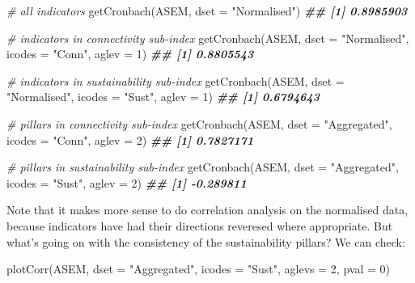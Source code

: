 \documentclass[
]{book}
\newenvironment{Shaded}{\begin{snugshade}}{\end{snugshade}}
\newcommand{\AttributeTok}[1]{\textcolor[rgb]{0.77,0.63,0.00}{#1}}
\newcommand{\CommentTok}[1]{\textcolor[rgb]{0.56,0.35,0.01}{\textit{#1}}}
\newcommand{\DecValTok}[1]{\textcolor[rgb]{0.00,0.00,0.81}{#1}}
\newcommand{\DocumentationTok}[1]{\textcolor[rgb]{0.56,0.35,0.01}{\textbf{\textit{#1}}}}
\newcommand{\FunctionTok}[1]{\textcolor[rgb]{0.00,0.00,0.00}{#1}}
\newcommand{\NormalTok}[1]{#1}
\newcommand{\StringTok}[1]{\textcolor[rgb]{0.31,0.60,0.02}{#1}}
\begin{document}
\begin{Shaded}
\begin{Highlighting}[]
\CommentTok{\# all indicators}
\FunctionTok{getCronbach}\NormalTok{(ASEM, }\AttributeTok{dset =} \StringTok{"Normalised"}\NormalTok{)}
\DocumentationTok{\#\# [1] 0.8985903}

\CommentTok{\# indicators in connectivity sub{-}index}
\FunctionTok{getCronbach}\NormalTok{(ASEM, }\AttributeTok{dset =} \StringTok{"Normalised"}\NormalTok{, }\AttributeTok{icodes =} \StringTok{"Conn"}\NormalTok{, }\AttributeTok{aglev =} \DecValTok{1}\NormalTok{)}
\DocumentationTok{\#\# [1] 0.8805543}

\CommentTok{\# indicators in sustainability sub{-}index}
\FunctionTok{getCronbach}\NormalTok{(ASEM, }\AttributeTok{dset =} \StringTok{"Normalised"}\NormalTok{, }\AttributeTok{icodes =} \StringTok{"Sust"}\NormalTok{, }\AttributeTok{aglev =} \DecValTok{1}\NormalTok{)}
\DocumentationTok{\#\# [1] 0.6794643}

\CommentTok{\# pillars in connectivity sub{-}index}
\FunctionTok{getCronbach}\NormalTok{(ASEM, }\AttributeTok{dset =} \StringTok{"Aggregated"}\NormalTok{, }\AttributeTok{icodes =} \StringTok{"Conn"}\NormalTok{, }\AttributeTok{aglev =} \DecValTok{2}\NormalTok{)}
\DocumentationTok{\#\# [1] 0.7827171}

\CommentTok{\# pillars in sustainability sub{-}index}
\FunctionTok{getCronbach}\NormalTok{(ASEM, }\AttributeTok{dset =} \StringTok{"Aggregated"}\NormalTok{, }\AttributeTok{icodes =} \StringTok{"Sust"}\NormalTok{, }\AttributeTok{aglev =} \DecValTok{2}\NormalTok{)}
\DocumentationTok{\#\# [1] {-}0.289811}
\end{Highlighting}
\end{Shaded}

Note that it makes more sense to do correlation analysis on the normalised data, because indicators have had their directions reveresed where appropriate. But what's going on with the consistency of the sustainability pillars? We can check:

\begin{Shaded}
\begin{Highlighting}[]
\FunctionTok{plotCorr}\NormalTok{(ASEM, }\AttributeTok{dset =} \StringTok{"Aggregated"}\NormalTok{, }\AttributeTok{icodes =} \StringTok{"Sust"}\NormalTok{, }\AttributeTok{aglevs =} \DecValTok{2}\NormalTok{, }\AttributeTok{pval =} \DecValTok{0}\NormalTok{)}
\end{Highlighting}
\end{Shaded}
\end{document}
